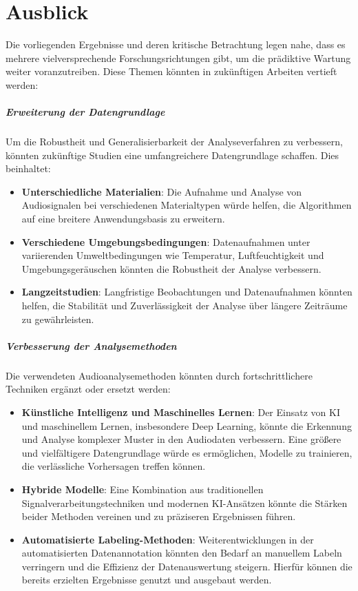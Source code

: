 \chapter{Ausblick}
\label{Kapitel9}

Die vorliegenden Ergebnisse und deren kritische Betrachtung legen nahe, dass es mehrere vielversprechende Forschungsrichtungen gibt, um die prädiktive Wartung weiter voranzutreiben. Diese Themen könnten in zukünftigen Arbeiten vertieft werden:

\paragraph{Erweiterung der Datengrundlage}

Um die Robustheit und Generalisierbarkeit der Analyseverfahren zu verbessern, könnten zukünftige Studien eine umfangreichere Datengrundlage schaffen. Dies beinhaltet:
\begin{itemize}
    \item \textbf{Unterschiedliche Materialien}: Die Aufnahme und Analyse von Audiosignalen bei verschiedenen Materialtypen würde helfen, die Algorithmen auf eine breitere Anwendungsbasis zu erweitern.
    \item \textbf{Verschiedene Umgebungsbedingungen}: Datenaufnahmen unter variierenden Umweltbedingungen wie Temperatur, Luftfeuchtigkeit und Umgebungsgeräuschen könnten die Robustheit der Analyse verbessern.
    \item \textbf{Langzeitstudien}: Langfristige Beobachtungen und Datenaufnahmen könnten helfen, die Stabilität und Zuverlässigkeit der Analyse über längere Zeiträume zu gewährleisten.
\end{itemize}

\paragraph{Verbesserung der Analysemethoden}

Die verwendeten Audioanalysemethoden könnten durch fortschrittlichere Techniken ergänzt oder ersetzt werden:
\begin{itemize}
    \item \textbf{Künstliche Intelligenz und Maschinelles Lernen}: Der Einsatz von KI und maschinellem Lernen, insbesondere Deep Learning, könnte die Erkennung und Analyse komplexer Muster in den Audiodaten verbessern. Eine größere und vielfältigere Datengrundlage würde es ermöglichen, Modelle zu trainieren, die verlässliche Vorhersagen treffen können.
    \item \textbf{Hybride Modelle}: Eine Kombination aus traditionellen Signalverarbeitungstechniken und modernen KI-Ansätzen könnte die Stärken beider Methoden vereinen und zu präziseren Ergebnissen führen.
    \item \textbf{Automatisierte Labeling-Methoden}: Weiterentwicklungen in der automatisierten Datenannotation könnten den Bedarf an manuellem Labeln verringern und die Effizienz der Datenauswertung steigern. Hierfür können die bereits erzielten Ergebnisse genutzt und ausgebaut werden.
\end{itemize}

